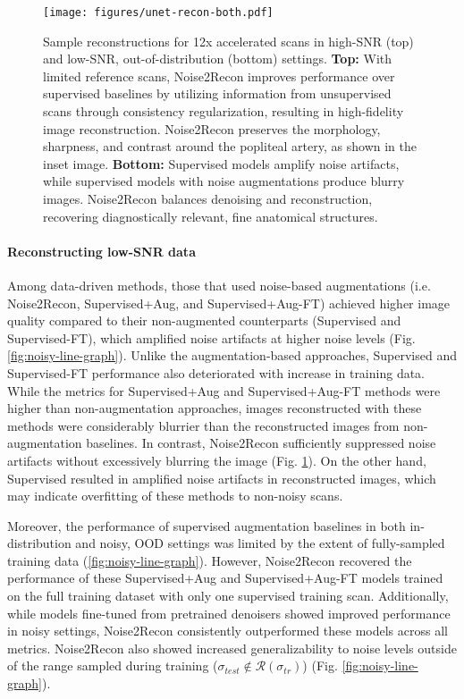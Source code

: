 \documentclass[10pt,twocolumn,letterpaper]{article}
\newcommand{\noiserange}{\mathcal{R}(\sigma_{tr})}
\newcommand{\testnoise}{\sigma_{test}}
\newcommand{\RV}[1]{{#1}}
\begin{document}
\begin{figure}[t!]
  \centering
  \begin{center}
      \texttt{[image: figures/unet-recon-both.pdf]}
  \end{center}
  \caption{Sample reconstructions for 12x accelerated scans in high-SNR (top) and low-SNR, out-of-distribution (bottom) settings. \textbf{Top:} With limited reference scans, Noise2Recon improves performance over supervised baselines by utilizing information from unsupervised scans through consistency regularization, resulting in high-fidelity image reconstruction. Noise2Recon preserves the morphology, sharpness, and contrast around the popliteal artery, as shown in the inset image. \textbf{Bottom:} Supervised models amplify noise artifacts, while supervised models with noise augmentations produce blurry images. Noise2Recon balances denoising and reconstruction, recovering diagnostically relevant, fine anatomical structures.}
  \label{fig:sample-images-1sub}
\end{figure}


\paragraph{Reconstructing low-SNR data} Among data-driven methods, those that used noise-based augmentations (i.e. Noise2Recon, Supervised+Aug, and Supervised+Aug-FT) achieved higher image quality compared to their non-augmented counterparts (Supervised and Supervised-FT), which amplified noise artifacts at higher noise levels (Fig. \ref{fig:noisy-line-graph}). Unlike the augmentation-based approaches, Supervised and Supervised-FT performance also deteriorated with increase in training data.
While the metrics for Supervised+Aug and Supervised+Aug-FT methods were higher than non-augmentation approaches, images reconstructed with these methods were considerably blurrier than the reconstructed images from non-augmentation baselines. In contrast, Noise2Recon sufficiently suppressed noise artifacts without excessively blurring the image (Fig. \ref{fig:sample-images-1sub}). On the other hand, Supervised resulted in amplified noise artifacts in reconstructed images, which may indicate overfitting of these methods to non-noisy scans.


\RV{Moreover, the performance of supervised augmentation baselines in both in-distribution and noisy, OOD settings was limited by the extent of fully-sampled training data (\cref{fig:noisy-line-graph})}. However, Noise2Recon recovered the performance of these Supervised+Aug and Supervised+Aug-FT models trained on the full training dataset with only one supervised training scan. Additionally, while models fine-tuned from pretrained denoisers showed improved performance in noisy settings, Noise2Recon consistently outperformed these models across all metrics. Noise2Recon also showed increased generalizability to noise levels outside of the range sampled during training ($\testnoise \notin \noiserange$) (Fig. \ref{fig:noisy-line-graph}).
\end{document}
